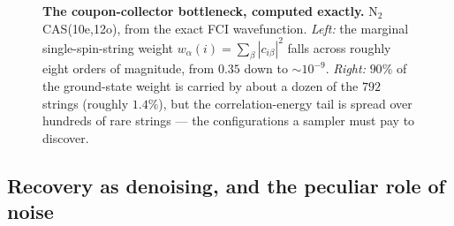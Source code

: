 \documentclass[11pt]{article}
\begin{document}
\begin{figure}[tb]
\caption{\textbf{The coupon-collector bottleneck, computed exactly.} N$_2$ CAS(10e,12o), from the exact FCI wavefunction. \emph{Left:} the marginal single-spin-string weight $w_\alpha(i)=\sum_\beta|c_{i\beta}|^2$ falls across roughly eight orders of magnitude, from $0.35$ down to ${\sim}10^{-9}$. \emph{Right:} $90\%$ of the ground-state weight is carried by about a dozen of the $792$ strings (roughly $1.4\%$), but the correlation-energy tail is spread over hundreds of rare strings --- the configurations a sampler must pay to discover.}
\label{fig:coupon}
\end{figure}


\subsection{Recovery as denoising, and the peculiar role of noise}\label{sec:3-2}
\end{document}
